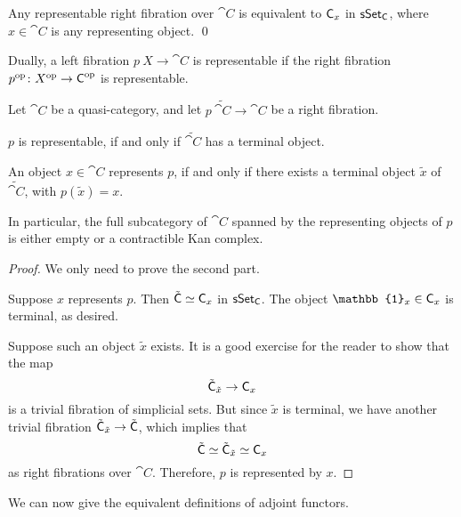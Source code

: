 \begin{proposition} \label{thm-6-rrf}
    Any representable right fibration over $\cat{C}$ is equivalent to 
    $\textup{\textsf{C}}_{\/x}$ in $\textup{\textsf{sSet}}_{\/\textup{\textsf{C}}}$,
    where $x\in\cat{C}$ is any representing object. \qed
\end{proposition}

Dually, a left fibration $p\:X\to\cat C$ is representable 
if the right fibration $p^{\mathrm{op}}\colon X^{\mathrm{op}}\to\textup{\textsf{C}}^{\mathrm{op}}$ is representable.

\begin{proposition}
    Let $\cat C$ be a quasi-category,
    and let $p\:\tilde{\cat C}\to\cat C$ be a right fibration.
    \begin{itms}
        \item $p$ is representable, if and only if $\tilde{\cat C}$
        has a terminal object.
        \item An object $x\in\cat C$ represents $p$,
        if and only if there exists a terminal object $\tilde x$ of $\tilde{\cat C}$,
        with $p(\tilde x)=x$.
    \end{itms}
    In particular, the full subcategory of $\cat C$
    spanned by the representing objects of $p$
    is either empty or a contractible Kan complex.
\end{proposition}

\begin{proof}
    We only need to prove the second part.

    Suppose $x$ represents $p$.
    Then $\tilde{\textup{\textsf{C}}}\simeq\textup{\textsf{C}}_{\/x}$ in $\textup{\textsf{sSet}}_{\/\textup{\textsf{C}}}$.
    The object $\mathbb{1}_x\in\cat{C}_{\/x}$ is terminal, as desired.

    Suppose such an object $\tilde{x}$ exists.
    It is a good exercise for the reader to show that the map
    \[ \tilde{\textup{\textsf{C}}}_{\/\tilde{x}} \to \textup{\textsf{C}}_{\/x} \]
    is a trivial fibration of simplicial sets.
    But since $\tilde{x}$ is terminal,
    we have another trivial fibration $\tilde{\textup{\textsf{C}}}_{\/\tilde{x}}\to\tilde{\textup{\textsf{C}}}$,
    which implies that 
    \[ \tilde{\textup{\textsf{C}}} \simeq \tilde{\textup{\textsf{C}}}_{\/\tilde{x}} \simeq \textup{\textsf{C}}_{\/x} \]
    as right fibrations over $\cat{C}$.
    Therefore, $p$ is represented by $x$.
\end{proof}

We can now give the equivalent definitions
of adjoint functors.

